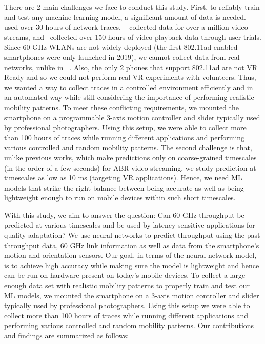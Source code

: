 \documentclass[sigconf,anonymous]{acmart}
\begin{document}
There are 2 main challenges we face to conduct this study. First, to
reliably train and test any machine learning model, a significant
amount of data is needed.~\cite{mao:sigcomm2017} used over 30 hours of
network traces, ~\cite{yan:nsdi2020} collected data for over a million
video streams, and~\cite{xu:conext2017} collected over 150 hours of
video playback data through user trials. Since 60 GHz WLANs are not
widely deployed (the first 802.11ad-enabled smartphones were only
launched in 2019), we cannot collect data from real networks, unlike
in ~\cite{mao:sigcomm2017,yan:nsdi2020}. Also, the only 2 phones that
support 802.11ad are not VR Ready and so we could not perform real VR
experiments with volunteers. Thus, we wanted a way to collect
traces in a controlled environment efficiently and in an automated way
while still considering the importance of performing realistic
mobility patterns. To meet these conflicting requirements, we mounted
the smartphone on a programmable 3-axis motion controller and slider
typically used by professional photographers. Using this setup, we
were able to collect more than 100 hours of traces while running
different applications and performing various controlled and random
mobility patterns. The second challenge is that, unlike previous
works, which make predictions only on coarse-grained timescales (in
the order of a few seconds) for ABR video streaming, we study prediction at
timescales as low as 10 ms (targeting VR applications). Hence, we need
ML models that strike the right balance between being accurate as well
as being lightweight enough to run on mobile devices within such short
timescales.

 With this study, we aim to answer the question: Can 60 GHz
throughput be predicted at various timescales and be used by latency
sensitive applications for quality adaptation? We use neural networks
to predict throughput using the past throughput data, 60 GHz link
information as well as data from the smartphone's motion and
orientation sensors. Our goal, in terms of the neural network model,
is to achieve high accuracy while making sure the model is lightweight
and hence can be run on hardware present on today's mobile devices. To
collect a large enough data set with realistic mobility patterns to
properly train and test our ML models, we mounted the smartphone on a
3-axis motion controller and slider typically used by professional
photographers. Using this setup we were able to collect more than 100
hours of traces while running different applications and performing
various controlled and random mobility patterns.  \fi Our
contributions and findings are summarized as follows:
\end{document}
